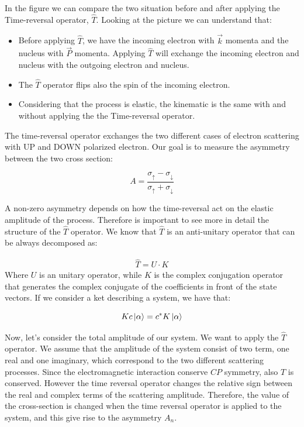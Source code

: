 In the figure we can compare the two situation before and after applying the Time-reversal operator, $\hat{T}$. Looking at the picture we can understand that: 

\begin{itemize}
\item Before applying $\hat{T}$, we have the incoming electron with $\vec{k}$ momenta and the nucleus with $\vec{P}$ momenta. Applying $\hat{T}$ will exchange the incoming electron and nucleus with the outgoing electron and nucleus.
\item The $\hat{T}$ operator flips also the spin of the incoming electron.
\item Considering that the process is elastic, the kinematic is the same with and without applying the the Time-reversal operator. 
\end{itemize}

The time-reversal operator exchanges the two different cases of electron scattering with UP and DOWN polarized electron. Our goal is to measure the asymmetry between the two cross section:

\begin{equation}
A = \frac{\sigma_{\uparrow} - \sigma_{\downarrow}}{\sigma_{\uparrow} + \sigma_{\downarrow}}
\end{equation}

A non-zero asymmetry depends on how the time-reversal act on the elastic amplitude of the process. Therefore is important to see more in detail the structure of the $\hat{T}$ operator. We know that $\hat{T}$ is an anti-unitary operator that can be always decomposed as:

\begin{align*}
\hat{T} = U \cdot K
\end{align*} 
Where $U$ is an unitary operator, while $K$ is the complex conjugation operator that generates the complex conjugate of the coefficients in front of the state vectors. If we consider a ket describing a system, we have that:

\begin{equation}
Kc \ket{\alpha} = c^{*} K \ket{\alpha}
\end{equation}

Now, let's consider the total amplitude of our system. We want to apply the $\hat{T}$ operator. We assume that the amplitude of the system consist of two term, one real and one imaginary, which correspond to the two different scattering processes. Since the electromagnetic interaction conserve $CP$ symmetry, also $T$ is conserved. However the time reversal operator changes the relative sign between the real and complex terms of the scattering amplitude. Therefore, the value of the cross-section is changed when the time reversal operator is applied to the system, and this give rise to the asymmetry $A_{n}$.

